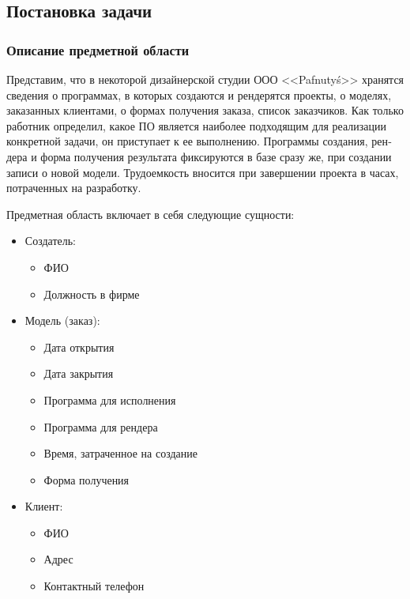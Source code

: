\documentclass[a4paper, 12pt, titlepage]{article}
\begin{document}
\begin{otherlanguage}{russian}
\subsection{Постановка задачи}
\subsubsection{Описание предметной области}
\vspace{10mm}

\par Представим, что в некоторой дизайнерской студии ООО <<Pafnuty\'s>> хранятся сведения о программах, в которых создаются и рендерятся проекты, о моделях, заказанных клиентами, о формах получения заказа, список заказчиков. Как  только работник определил, какое ПО является наиболее подходящим для реализации конкретной задачи, он приступает к ее выполнению. Программы создания, рендера и форма получения результата фиксируются в базе сразу же, при создании записи о новой модели. Трудоемкость вносится при завершении проекта в часах, потраченных на разработку. \\

\par Предметная область включает в себя следующие сущности:

\begin{itemize}
\item Создатель:
  \begin{itemize}
  \item ФИО
  \item Должность в фирме
  \end{itemize}
\item Модель (заказ):
  \begin{itemize}
  \item Дата открытия
  \item Дата закрытия
  \item Программа для исполнения
  \item Программа для рендера
  \item Время, затраченное на создание
  \item Форма получения
  \end{itemize}

\item Клиент:
  \begin{itemize}
  \item ФИО
  \item Адрес
  \item Контактный телефон
  \end{itemize}
\end{itemize}


\end{otherlanguage}
\end{document}
